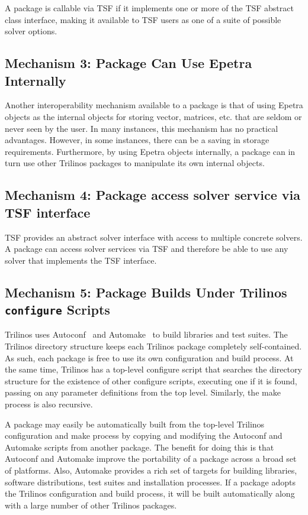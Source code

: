 \documentclass[12pt,relax]{SANDreport}
\begin{document}
A package is callable via TSF if it implements one or more of the TSF
abstract class interface, making it available to TSF users as one of a
suite of possible solver options.

\subsection{Mechanism 3: Package Can Use Epetra Internally}

Another interoperability mechanism available to a package is that of
using Epetra objects as the
internal objects for storing vector, matrices, etc. that are seldom or
never seen by the user.  In many instances, this mechanism has no
practical advantages.  However, in some instances, there can be a
saving in storage requirements.  Furthermore, by using Epetra objects
internally, a package can in turn use other Trilinos packages to
manipulate its own internal objects.

\subsection{Mechanism 4: Package access solver service via TSF interface}
TSF provides an abstract solver interface with access to multiple concrete solvers. 
A package can access solver services via TSF and therefore be able to use
any solver that implements the TSF interface.

\subsection{Mechanism 5: Package Builds Under Trilinos {\tt configure} Scripts}
Trilinos uses Autoconf~\cite{Autoconf} and Automake~\cite{Automake} to
build libraries and test suites.  The Trilinos directory structure
keeps each Trilinos package completely self-contained.  As such, each
package is free to use its own configuration and build process.  At
the same time, Trilinos has a top-level configure script that searches
the directory structure for the existence of other configure scripts,
executing one if it is found, passing on any parameter definitions
from the top level.  Similarly, the make process is also recursive.

A package may easily be automatically built from the top-level
Trilinos configuration and make process by copying and modifying the
Autoconf and Automake scripts from another package.  The benefit for
doing this is that Autoconf and Automake improve the portability of a
package across a broad set of platforms.  Also, Automake provides a
rich set of targets for building libraries, software distributions,
test suites and installation processes.  If a package adopts the
Trilinos configuration and build process, it will be built
automatically along with a large number of other Trilinos packages.
\end{document}
